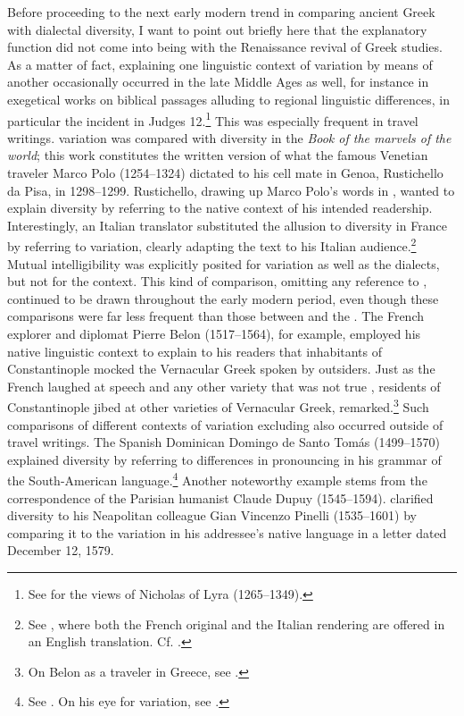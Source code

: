 Before proceeding to the next early modern trend in comparing ancient Greek with  dialectal diversity, I want to point out briefly here that the explanatory function did not come into being with the Renaissance revival of Greek studies. As a matter of fact, explaining one linguistic context of variation by means of another occasionally occurred in the late Middle Ages as well, for instance in exegetical works on biblical passages alluding to regional linguistic differences, in particular the  incident in Judges 12.\footnote{See \citet[199--200]{VanRooy2018b} for the views of Nicholas of Lyra (1265–1349).} This was especially frequent in travel writings.  variation was compared with  diversity in the \textit{Book of the marvels of the world}; this work constitutes the written version of what the famous Venetian traveler Marco Polo (1254–1324) dictated to his cell mate in Genoa, Rustichello da Pisa, in 1298–1299. Rustichello, drawing up Marco Polo’s words in , wanted to explain  diversity by referring to the native context of his intended readership. Interestingly, an Italian translator substituted the allusion to diversity in France by referring to  variation, clearly adapting the text to his Italian audience.\footnote{See \citet[157]{Polo1938}, where both the French original and the Italian rendering are offered in an English translation. Cf. \citet[855]{Borst1959}.} Mutual intelligibility was explicitly posited for  variation as well as the  dialects, but not for the  context. This kind of comparison, omitting any reference to , continued to be drawn throughout the early modern period, even though these comparisons were far less frequent than those between  and the . The French explorer and diplomat Pierre Belon (1517–1564), for example, employed his native linguistic context to explain to his readers that inhabitants of Constantinople mocked the Vernacular Greek spoken by outsiders. Just as the French laughed at  speech and any other  variety that was not true , residents of Constantinople jibed at other varieties of Vernacular Greek, \citet[5\textsc{\textsuperscript{v}}]{Belon1553} remarked.\footnote{On Belon as a traveler in Greece, see \citet[esp. 122]{Vingopoulou2004}.} Such comparisons of different contexts of variation excluding  also occurred outside of travel writings. The Spanish Dominican Domingo de Santo Tomás (1499–1570) explained  diversity by referring to  differences in pronouncing  in his grammar of the South-American language.\footnote{See \citet[1\textsc{\textsuperscript{v}}]{Santo1560}. On his eye for variation, see \citet[140]{Calvo2005}.} Another noteworthy example stems from the correspondence of the Parisian humanist Claude Dupuy (1545–1594). \citet[274]{Dupuy2001} clarified  diversity to his Neapolitan colleague Gian Vincenzo Pinelli (1535–1601) by comparing it to the variation in his addressee’s native  language in a letter dated December 12, 1579.
